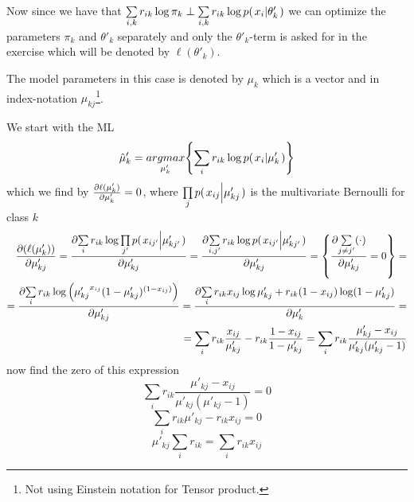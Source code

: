 \documentclass[a4paper,twoside=false,abstract=false,numbers=noenddot,
titlepage=false,headings=small,parskip=half,version=last]{scrartcl}
\begin{document}
\begin{solution}
    Now since we have that $\sum\limits_{i,k}r_{ik}\log\pi_k \perp
    \sum\limits_{i,k}r_{ik}\log p{(\left. x_i \middle\vert \theta'_k \right.)}$ we can optimize the parameters
    $\pi_k$ and $\theta'_k$ separately and only the $\theta'_k$-term is asked for in the
    exercise which will be denoted by $\ell(\theta'_k)$.

    The model parameters in this case is denoted by $\mu_k$ which is a vector
    and in index-notation $\mu_{kj}$\footnote{Not using Einstein notation for
    Tensor product.}.

    We start with the ML
    \begin{equation}
        \hat{\mu}'_k = \underset{\mu'_k}{argmax}{\left\{\sum\limits_i
        r_{ik}\log p{(\left. x_i \middle\vert \mu'_k \right.)}\right\}}
    \end{equation}
    which we find by $\frac{\partial{\ell(\mu'_k)}}{\partial{\mu'_k}}=0$, where 
    $\prod\limits_j p{(\left. x_{ij} \middle\vert \mu'_{kj} \right.)}$ 
    is the multivariate Bernoulli for class $k$
    \begin{eqnarray}
        \frac{\partial{
            \left(
            \ell(\mu'_k)
            \right)
        }}{\partial{
            \mu'_{kj}
        }} = 
        \frac{\partial{
            \sum\limits_i r_{ik}\log \prod\limits_{j'} p{(\left. x_{ij'} \middle\vert \mu'_{kj'} \right.)}
        }}{\partial{
            \mu'_{kj} 
        }}=
        \frac{\partial{
        \sum\limits_{i,j'} r_{ik}\log p{(\left. x_{ij'} \middle\vert \mu'_{kj'} \right.)} 
        }}{\partial{
            \mu'_{kj}
        }}= \left\{
            \frac{\partial{
                \sum\limits_{j\neq j'} (\cdot)
            }}{\partial{
                \mu'_{kj}
            }} = 0
            \right\}  = \\
        =
        \frac{\partial{
            \sum\limits_{i}r_{ik}\log \left(
                {\mu'_{kj}}^{x_{ij}}
                (1-{\mu'_{kj}})^{(1-x_{ij})}
            \right)
        }}{\partial{
            \mu'_{kj}
        }}
        =
        \frac{\partial{
            \sum\limits_{i}r_{ik} x_{ij}\log{\mu'_{kj}} + r_{ik}(1-x_{ij})\log({1-\mu'_{kj}})
        }}{\partial{
            \mu'_k  
        }} = \\
        = \sum\limits_{i} r_{ik}\frac{x_{ij}}{\mu'_{kj}} -
        r_{ik}\frac{1-x_{ij}}{1-\mu'_{kj}} =
        \sum\limits_i r_{ik}\frac{
            \mu'_{kj} - x_{ij}
        }
        {
            \mu'_{kj}(\mu'_{kj}-1)    
        }
    \end{eqnarray}
    now find the zero of this expression
    \begin{equation}
         \sum\limits_i r_{ik}\frac{
            \mu'_{kj} - x_{ij}
        }
        {
            \mu'_{kj}(\mu'_{kj}-1)    
        } = 0
    \end{equation}
    \begin{equation}
         \sum\limits_i
            r_{ik}\mu'_{kj} - r_{ik}x_{ij}
         = 0
    \end{equation}
    \begin{equation}
        \mu'_{kj}\sum\limits_i r_{ik} = \sum\limits_i r_{ik} x_{ij} 
    \end{equation}


\end{solution}
\end{document}
